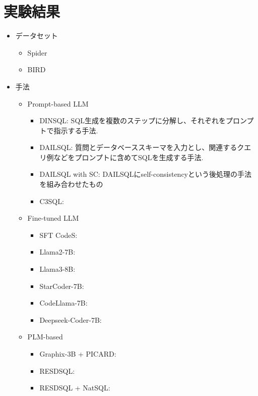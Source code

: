 \documentclass[dvipdfmx,uplatex]{jsarticle}
\theoremstyle{remark}
\newenvironment{experiment}[1]{
    \begin{tcolorbox}[
        colframe=violet,
        colback=violet!10!white,
        colbacktitle=violet!40!white,
        coltitle=black,
        fonttitle=\bfseries,
        title={#1}
    ]
}{
    \end{tcolorbox}
}
\begin{document}
\section{実験結果}
\begin{experiment}{実験手法}
\begin{itemize}
    \item データセット
    \begin{itemize}
        \item Spider
        \item BIRD
    \end{itemize}
    \item 手法
    \begin{itemize}
        \item Prompt-based LLM
        \begin{itemize}
            \item DINSQL: SQL生成を複数のステップに分解し、それぞれをプロンプトで指示する手法.
            \item DAILSQL: 質問とデータベーススキーマを入力とし、関連するクエリ例などをプロンプトに含めてSQLを生成する手法.
            \item DAILSQL with SC: DAILSQLにself-consistencyという後処理の手法を組み合わせたもの
            \item C3SQL: 
        \end{itemize}
        \item Fine-tuned LLM
        \begin{itemize}
            \item SFT CodeS: 
            \item Llama2-7B: 
            \item Llama3-8B: 
            \item StarCoder-7B: 
            \item CodeLlama-7B: 
            \item Deepseek-Coder-7B: 
        \end{itemize}
        \item PLM-based
        \begin{itemize}
            \item Graphix-3B + PICARD: 
            \item RESDSQL: 
            \item RESDSQL + NatSQL: 
        \end{itemize}
    \end{itemize}
\end{itemize}
\end{experiment}
\end{document}
